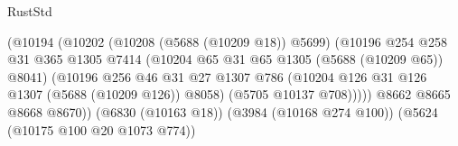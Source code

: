 \begin{lexlean}{RustStd}
\begin{coremodule}
                                                    (@10194
                                                      (@10202
                                                        (@10208 (@5688 (@10209 @18)) @5699)
                                                        (@10196
                                                          @254
                                                          @258
                                                          @31
                                                          @365
                                                          @1305
                                                          @7414
                                                          (@10204
                                                            @65
                                                            @31
                                                            @65
                                                            @1305
                                                            (@5688 (@10209 @65))
                                                            @8041)
                                                          (@10196
                                                            @256
                                                            @46
                                                            @31
                                                            @27
                                                            @1307
                                                            @786
                                                            (@10204
                                                              @126
                                                              @31
                                                              @126
                                                              @1307
                                                              (@5688 (@10209 @126))
                                                              @8058)
                                                            (@5705 @10137 @708)))))
                                                    @8662
                                                    @8665
                                                    @8668
                                                    @8670))
                                                (@6830 (@10163 @18))
                                                (@3984 (@10168 @274 @100))
                                                (@5624 (@10175 @100 @20 @1073 @774))

\end{coremodule}
\end{lexlean}
